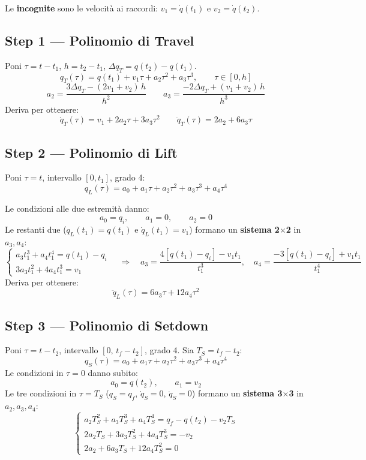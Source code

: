 \documentclass[10pt,a4paper]{article}
\begin{document}
Le \textbf{incognite} sono le velocit\`a ai raccordi: $v_1 = \dot{q}(t_1)$ e $v_2 = \dot{q}(t_2)$.

\subsection{Step 1 --- Polinomio di Travel}

Poni $\tau = t - t_1$, $h = t_2 - t_1$, $\Delta q_T = q(t_2) - q(t_1)$.
\[
q_T(\tau) = q(t_1) + v_1\tau + a_2\tau^2 + a_3\tau^3, \qquad \tau\in[0,h]
\]
\[
a_2 = \frac{3\Delta q_T - (2v_1+v_2)\,h}{h^2} \qquad
a_3 = \frac{-2\Delta q_T + (v_1+v_2)\,h}{h^3}
\]
Deriva per ottenere:
\[
\dot{q}_T(\tau) = v_1 + 2a_2\tau + 3a_3\tau^2 \qquad
\ddot{q}_T(\tau) = 2a_2 + 6a_3\tau
\]

\subsection{Step 2 --- Polinomio di Lift}

Poni $\tau = t$, intervallo $[0,t_1]$, grado 4:
\[
q_L(\tau) = a_0 + a_1\tau + a_2\tau^2 + a_3\tau^3 + a_4\tau^4
\]

Le condizioni alle due estremit\`a danno:
\[
a_0 = q_i, \qquad a_1 = 0, \qquad a_2 = 0
\]
Le restanti due ($q_L(t_1)=q(t_1)$ e $\dot{q}_L(t_1)=v_1$) formano un \textbf{sistema 2$\times$2} in $a_3,a_4$:
\[
\begin{cases}
a_3 t_1^3 + a_4 t_1^4 = q(t_1) - q_i\\[4pt]
3a_3 t_1^2 + 4a_4 t_1^3 = v_1
\end{cases}
\quad\Rightarrow\quad
a_3 = \frac{4[q(t_1)-q_i] - v_1 t_1}{t_1^3}, \quad
a_4 = \frac{-3[q(t_1)-q_i] + v_1 t_1}{t_1^4}
\]
Deriva per ottenere:
\[
\ddot{q}_L(\tau) = 6a_3\tau + 12a_4\tau^2
\]

\subsection{Step 3 --- Polinomio di Setdown}

Poni $\tau = t - t_2$, intervallo $[0,\, t_f-t_2]$, grado 4. Sia $T_S = t_f - t_2$:
\[
q_S(\tau) = a_0 + a_1\tau + a_2\tau^2 + a_3\tau^3 + a_4\tau^4
\]
Le condizioni in $\tau=0$ danno subito:
\[
a_0 = q(t_2), \qquad a_1 = v_2
\]
Le tre condizioni in $\tau = T_S$ ($q_S = q_f$, $\dot{q}_S = 0$, $\ddot{q}_S = 0$) formano un \textbf{sistema 3$\times$3} in $a_2,a_3,a_4$:
\[
\begin{cases}
a_2 T_S^2 + a_3 T_S^3 + a_4 T_S^4 = q_f - q(t_2) - v_2 T_S\\[4pt]
2a_2 T_S + 3a_3 T_S^2 + 4a_4 T_S^3 = -v_2\\[4pt]
2a_2 + 6a_3 T_S + 12a_4 T_S^2 = 0
\end{cases}
\]
\end{document}
